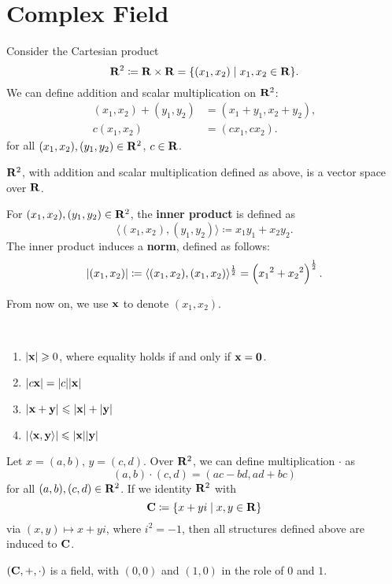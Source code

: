\section{Complex Field}
Consider the Cartesian product
\[\mathbf R^2\coloneqq\mathbf R\times\mathbf R=\{(x_1,x_2)\mid x_1,x_2\in\mathbf R\}.\]
We can define addition and scalar multiplication on $\mathbf R^2$:
\begin{align*}
(x_1,x_2)+(y_1,y_2)&=(x_1+y_1,x_2+y_2),\\
c(x_1,x_2)&=(cx_1,cx_2).
\end{align*}
for all $(x_1,x_2),(y_1,y_2)\in\mathbf R^2$, $c\in\mathbf R$.

\begin{proposition}
$\mathbf R^2$, with addition and scalar multiplication defined as above, is a vector space over $\mathbf R$.
\end{proposition}

For $(x_1,x_2),(y_1,y_2)\in\mathbf R^2$, the \textbf{inner product} is defined as 
\[\langle(x_1,x_2),(y_1,y_2)\rangle\coloneqq x_1y_1+x_2y_2.\]
The inner product induces a \textbf{norm}, defined as follows:
\[|(x_1,x_2)|\coloneqq\langle(x_1,x_2),(x_1,x_2)\rangle^\frac{1}{2}=\left({x_1}^2+{x_2}^2\right)^\frac{1}{2}. \]
\begin{notation}
From now on, we use $\vb{x}$ to denote $(x_1,x_2)$.
\end{notation}

\begin{proposition} \
\begin{enumerate}[label=(\roman*)]
\item $|\vb{x}|\geqslant0$, where equality holds if and only if $\vb{x}=\vb{0}$.
\item $|c\vb{x}|=|c||\vb{x}|$
\item $|\vb{x}+\vb{y}|\leqslant|\vb{x}|+|\vb{y}|$
\item $|\langle\vb{x},\vb{y}\rangle|\leqslant|\vb{x}||\vb{y}|$
\end{enumerate}
\end{proposition}

Let $x=(a,b)$, $y=(c,d)$. Over $\mathbf R^2$, we can define multiplication $\cdot$ as
\[(a,b)\cdot(c,d)=(ac-bd,ad+bc)\]
for all $(a,b),(c,d)\in\mathbf R^2$. If we identity $\mathbf R^2$ with
\[\mathbf C\coloneqq\{x+yi\mid x,y\in\mathbf R\}\]
via $(x,y)\mapsto x+yi$, where $i^2=-1$, then all structures defined above are induced to $\mathbf C$.

\begin{proposition}
$(\mathbf C,+,\cdot)$ is a field, with $(0,0)$ and $(1,0)$ in the role of $0$ and $1$.
\end{proposition}

